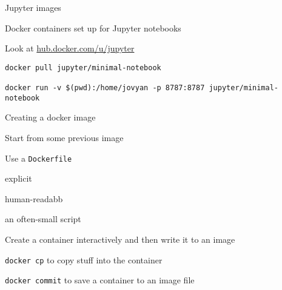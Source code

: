 \documentclass[aspectratio=169,12pt,t]{beamer}
\begin{document}
\begin{frame}[fragile]{Jupyter images}

  \bbi
\item Docker containers set up for Jupyter notebooks
\item Look at \href{https://hub.docker.com/u/jupyter}{hub.docker.com/u/jupyter}
  \ei

  \bigskip

\begin{lstlisting}
docker pull jupyter/minimal-notebook

docker run -v $(pwd):/home/jovyan -p 8787:8787 jupyter/minimal-notebook
\end{lstlisting}







\end{frame}




\begin{frame}{Creating a docker image}

  \bbi
  \item Start from some previous image
  \item Use a {\tt Dockerfile}
    \bi
  \item explicit
  \item human-readabb
  \item an often-small script
    \ei
  \item Create a container interactively and then write it to an image
    \bi
  \item {\tt docker cp} to copy stuff into the container
  \item {\tt docker commit} to save a container to an image file
    \ei
    \ei


\end{frame}
\end{document}
